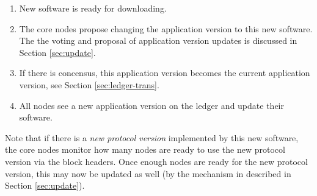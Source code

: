 \begin{enumerate}
  \item New software is ready for downloading.
  \item The core nodes propose changing
  the application version to this
  new software. The the voting and proposal of application version updates is discussed
    in Section \ref{sec:update}.
  \item If there is concensus, this application version becomes the current application version,
  see Section \ref{sec:ledger-trans}.
  \item All nodes see a new application version on the ledger and update their
  software.
\end{enumerate}

Note that if there is a \textit{new protocol version} implemented by this new
software, the core nodes monitor how many nodes are ready to use the new
protocol version via the block headers.
Once enough nodes are ready for the new protocol version, this
may now be updated as well (by the mechanism in described in 
Section \ref{sec:update}).

